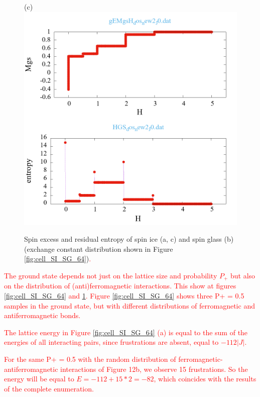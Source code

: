 \documentclass[preprint,12pt]{elsarticle}
\begin{document}
\begin{figure}[H]
\begin{minipage}[h]{0.32\linewidth}
		\end{minipage}
		\hfill
		\begin{minipage}[h]{0.32\linewidth}
			\centering(c)
			\includegraphics[width=1\linewidth]{pictures/_multiplot_SI64_J0}
		\end{minipage}
		
		\caption{Spin excess and residual entropy of spin ice (a, c) and spin glass (b) (exchange constant distribution shown in Figure \ref{fig:cell_SI_SG_64})\textcolor{red}{.}}
		\label{fig:_multiplot_SI_SG_64}
		
	\end{figure}
	
	\textcolor{red}{The ground state depends not just on the lattice size and probability $P_+$ but also on the distribution of (anti)ferromagnetic interactions. This show at figures \ref{fig:cell_SI_SG_64} and \ref{fig:_multiplot_SI_SG_64}. Figure \ref{fig:cell_SI_SG_64} shows three P+ = 0.5 samples in the ground state, but with different distributions of ferromagnetic and antiferromagnetic bonds.}
	
	\textcolor{red}{The lattice energy in Figure \ref{fig:cell_SI_SG_64} (a) is equal to the sum of the energies of all interacting pairs, since frustrations are absent, equal to $-112|J|$.}
	
	\textcolor{red}{For the same P+ = 0.5 with the random distribution of ferromagnetic-antiferromagnetic interactions of Figure 12b, we observe 15 frustrations. So the energy will be equal to $E = -112 + 15*2 = -82$, which coincides with the results of the complete enumeration.}
	
\end{document}
